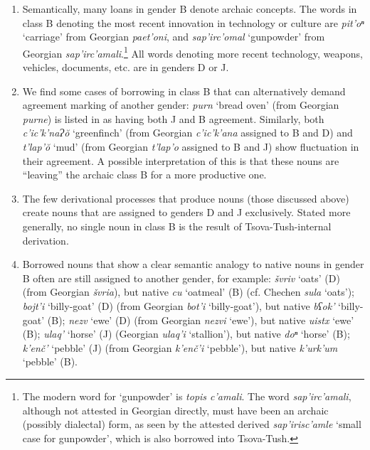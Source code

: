 \begin{enumerate}
	\item Semantically, many loans in gender B denote archaic concepts. The words in class B denoting the most recent innovation in technology or culture are \textit{pit'oⁿ} `carriage’ from Georgian \textit{paet'oni}, and \textit{sap'irc'omal} `gunpowder’ from Georgian \textit{sap'irc'amali}.\footnote{The modern word for `gunpowder' is \textit{topis c'amali}. The word \textit{sap'irc'amali}, although not attested in Georgian directly, must have been an archaic (possibly dialectal) form, as seen by the attested derived \textit{sap'irisc'amle} `small case for gunpowder', which is also borrowed into Tsova-Tush.} All words denoting more recent technology, weapons, vehicles, documents, etc. are in genders D or J. 
	
	\item We find some cases of borrowing in class B that can alternatively demand agreement marking of another gender: \textit{purn} `bread oven’ (from Georgian \textit{purne}) is listed in \textcite{kadkad84} as having both J and B agreement. Similarly, both \textit{c'ic'k'naɁ\u{o}} `greenfinch’ (from Georgian \textit{c'ic'k'ana} assigned to B and D) and \textit{t'lap'\u{o}} `mud’ (from Georgian \textit{t'lap'o} assigned to B and J) show fluctuation in their agreement. A possible interpretation of this is that these nouns are “leaving” the archaic class B for a more productive one. 
	
	\item The few derivational processes that produce nouns (those discussed above) create nouns that are assigned to genders D and J exclusively. Stated more generally, no single noun in class B is the result of Tsova-Tush-internal derivation.
	
	\item Borrowed nouns that show a clear semantic analogy to native nouns in gender B often are still assigned to another gender, for example: \textit{švriv} `oats’ (D) (from Georgian \textit{švria}), but native \textit{cu} `oatmeal’ (B) (cf. Chechen \textit{sula} ‘oats’); \textit{bojt'i} `billy-goat’ (D) (from Georgian \textit{bot'i} `billy-goat’), but native \textit{bʕok'} `billy-goat’ (B); \textit{nezv} `ewe’ (D) (from Georgian \textit{nezvi} `ewe’), but native \textit{uistx} `ewe’ (B); \textit{ulaq'} `horse’ (J) (Georgian \textit{ulaq'i} `stallion'), but native \textit{doⁿ} `horse’ (B); \textit{k'enč'} `pebble’ (J) (from Georgian \textit{k'enč'i} `pebble’), but native \textit{k'urk'um} `pebble’ (B).  
	
\end{enumerate}


